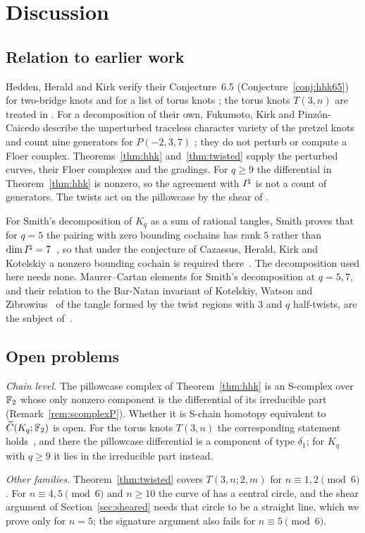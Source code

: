 \section{Discussion}\label{sec:disc}

\subsection{Relation to earlier work}\label{ss:disc-prior}
Hedden, Herald and Kirk verify their Conjecture~6.5 (Conjecture~\ref{conj:hhk65}) for two-bridge knots \cite[\S7]{HHK2} and for a
list of torus knots \cite[\S11]{HHK2}; the torus knots $T(3,n)$ are treated in \cite{WuebbenV}.  For
a decomposition of their own, Fukumoto, Kirk and Pinz\'on-Caicedo describe the unperturbed traceless
character variety of the pretzel knots and count nine generators for $P(-2,3,7)$ \cite[\S5]{FKP}; they do not perturb or compute a Floer complex.  Theorems~\ref{thm:hhk}
and~\ref{thm:twisted} supply the perturbed curves, their Floer complexes and the gradings.  For
$q\ge9$ the differential in Theorem~\ref{thm:hhk} is nonzero, so the agreement with $I^{\natural}$ is not a
count of generators.  The twists act on the pillowcase by the shear of \cite[(28)--(30)]{HHK2}.

For Smith's decomposition of $K_q$ as a sum of rational tangles, Smith proves that for $q=5$ the pairing with
zero bounding cochains has rank $5$ rather than $\dim I^{\natural}=7$~\cite[proof of Thm.~5.9]{Smith}, so that under the
conjecture of Cazassus, Herald, Kirk and Kotelskiy a nonzero bounding cochain is required
there~\cite[Thm.~5.9]{Smith}. The decomposition used here needs none. Maurer--Cartan elements for Smith's decomposition at
$q=5,7$, and their relation to the Bar-Natan invariant of Kotelskiy, Watson and Zibrowius~\cite{KWZ} of the tangle formed
by the twist regions with $3$ and $q$ half-twists, are the subject of~\cite{WuebbenIIb}.

\subsection{Open problems}\label{ss:disc-open}
\emph{Chain level.} The pillowcase complex of Theorem~\ref{thm:hhk} is an S-complex over $\mathbb{F}_2$ whose only nonzero
component is the differential of its irreducible part (Remark~\ref{rem:scomplexP}). Whether it is S-chain homotopy
equivalent to $\widetilde C(K_q;\mathbb{F}_2)$ is open. For the torus knots $T(3,n)$ the corresponding statement
holds~\cite[Thm.~1.3]{WuebbenV}, and there the pillowcase differential is a component of type $\delta_1$; for $K_q$
with $q\ge9$ it lies in the irreducible part instead.

\emph{Other families.}  Theorem~\ref{thm:twisted} covers $T(3,n;2,m)$ for $n\equiv1,2\pmod6$.  For
$n\equiv4,5\pmod6$ and $n\ge10$ the curve of \cite{WuebbenV} has a central circle, and the shear
argument of Section~\ref{sec:sheared} needs that circle to be a straight line, which we prove only for
$n=5$; the signature argument also fails for $n\equiv5\pmod6$.
